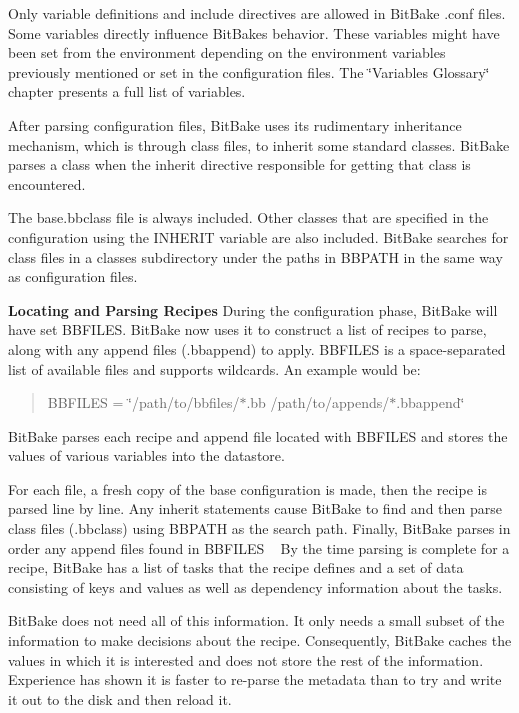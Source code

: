 \begin{DoxyItemize}
Only variable definitions and include directives are allowed in Bit\+Bake .conf files. Some variables directly influence Bit\+Bake\textquotesingle{}s behavior. These variables might have been set from the environment depending on the environment variables previously mentioned or set in the configuration files. The \char`\"{}\+Variables Glossary\char`\"{} chapter presents a full list of variables.

After parsing configuration files, Bit\+Bake uses its rudimentary inheritance mechanism, which is through class files, to inherit some standard classes. Bit\+Bake parses a class when the inherit directive responsible for getting that class is encountered.

The base.\+bbclass file is always included. Other classes that are specified in the configuration using the I\+N\+H\+E\+R\+IT variable are also included. Bit\+Bake searches for class files in a classes subdirectory under the paths in B\+B\+P\+A\+TH in the same way as configuration files.
\item {\bfseries Locating and Parsing Recipes} During the configuration phase, Bit\+Bake will have set B\+B\+F\+I\+L\+ES. Bit\+Bake now uses it to construct a list of recipes to parse, along with any append files (.bbappend) to apply. B\+B\+F\+I\+L\+ES is a space-\/separated list of available files and supports wildcards. An example would be\+:
\end{DoxyItemize}

\begin{quote}
B\+B\+F\+I\+L\+ES = \char`\"{}/path/to/bbfiles/$\ast$.\+bb /path/to/appends/$\ast$.\+bbappend\char`\"{} \end{quote}
Bit\+Bake parses each recipe and append file located with B\+B\+F\+I\+L\+ES and stores the values of various variables into the datastore.

For each file, a fresh copy of the base configuration is made, then the recipe is parsed line by line. Any inherit statements cause Bit\+Bake to find and then parse class files (.bbclass) using B\+B\+P\+A\+TH as the search path. Finally, Bit\+Bake parses in order any append files found in B\+B\+F\+I\+L\+ES ~\newline
 By the time parsing is complete for a recipe, Bit\+Bake has a list of tasks that the recipe defines and a set of data consisting of keys and values as well as dependency information about the tasks.

Bit\+Bake does not need all of this information. It only needs a small subset of the information to make decisions about the recipe. Consequently, Bit\+Bake caches the values in which it is interested and does not store the rest of the information. Experience has shown it is faster to re-\/parse the metadata than to try and write it out to the disk and then reload it.

